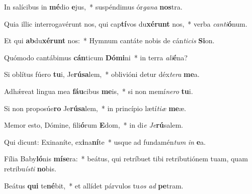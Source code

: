 \item In salícibus in \textbf{mé}dio \textbf{e}jus,~* suspéndimus ór\textit{ga}\textit{na} \textbf{nos}tra.
\item Quia illic interrogavérunt nos, qui cap\textbf{tí}vos du\textbf{xé}\textbf{runt} nos,~* verba \textit{can}\textit{ti}\textbf{ó}num.
\item Et qui \textbf{ab}du\textbf{xé}\textbf{runt} nos:~* Hymnum cantáte nobis de cán\textit{ti}\textit{cis} \textbf{Si}on.
\item Quómodo cantábimus \textbf{cán}ticum \textbf{Dó}\textbf{mi}ni~* in terra \textit{a}\textit{li}\textbf{é}na?
\item Si oblítus fúero \textbf{tu}i, Je\textbf{rú}\textbf{sa}lem,~* oblivióni detur déx\textit{te}\textit{ra} \textbf{me}a.
\item Adhǽreat lingua mea \textbf{fáu}cibus \textbf{me}is,~* si non memí\textit{ne}\textit{ro} \textbf{tu}i.
\item Si non proposúe\textbf{ro} Je\textbf{rú}\textbf{sa}lem,~* in princípio lætí\textit{ti}\textit{æ} \textbf{me}æ.
\item Memor esto, Dómine, fili\textbf{ó}rum \textbf{E}dom,~* in di\textit{e} \textit{Je}\textbf{rú}salem.
\item Qui dicunt: Exinaníte, ex\textbf{i}na\textbf{ní}te~* usque ad fundamén\textit{tum} \textit{in} \textbf{e}a.
\item Fília Baby\textbf{ló}nis \textbf{mí}\textbf{se}ra:~* beátus, qui retríbuet tibi retributiónem tuam, quam retribu\textit{ís}\textit{ti} \textbf{no}bis.
\item Beátus \textbf{qui} te\textbf{né}bit,~* et allídet párvulos tu\textit{os} \textit{ad} \textbf{pe}tram.
